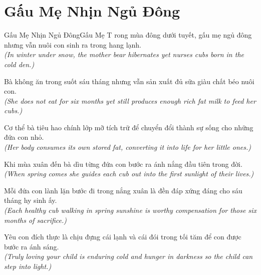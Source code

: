 \section{Gấu Mẹ Nhịn Ngủ Đông}
\begin{truyen}{Gấu Mẹ Nhịn Ngủ Đông}{Gấu Mẹ}
T rong mùa đông dưới tuyết, gấu mẹ ngủ đông nhưng vẫn nuôi con sinh ra trong hang lạnh.\\
\textit{(In winter under snow, the mother bear hibernates yet nurses cubs born in the cold den.)}

Bà không ăn trong suốt sáu tháng nhưng vẫn sản xuất đủ sữa giàu chất béo nuôi con.\\
\textit{(She does not eat for six months yet still produces enough rich fat milk to feed her cubs.)}

Cơ thể bà tiêu hao chính lớp mỡ tích trữ để chuyển đổi thành sự sống cho những đứa con nhỏ.\\
\textit{(Her body consumes its own stored fat, converting it into life for her little ones.)}

Khi mùa xuân đến bà dìu từng đứa con bước ra ánh nắng đầu tiên trong đời.\\
\textit{(When spring comes she guides each cub out into the first sunlight of their lives.)}

Mỗi đứa con lành lặn bước đi trong nắng xuân là đền đáp xứng đáng cho sáu tháng hy sinh ấy.\\
\textit{(Each healthy cub walking in spring sunshine is worthy compensation for those six months of sacrifice.)}

\end{truyen}
\begin{baihoc}
  Yêu con đích thực là chịu đựng cái lạnh và cái đói trong tối tăm để con được bước ra ánh sáng.\\
  \textit{(Truly loving your child is enduring cold and hunger in darkness so the child can step into light.)}
\end{baihoc}
